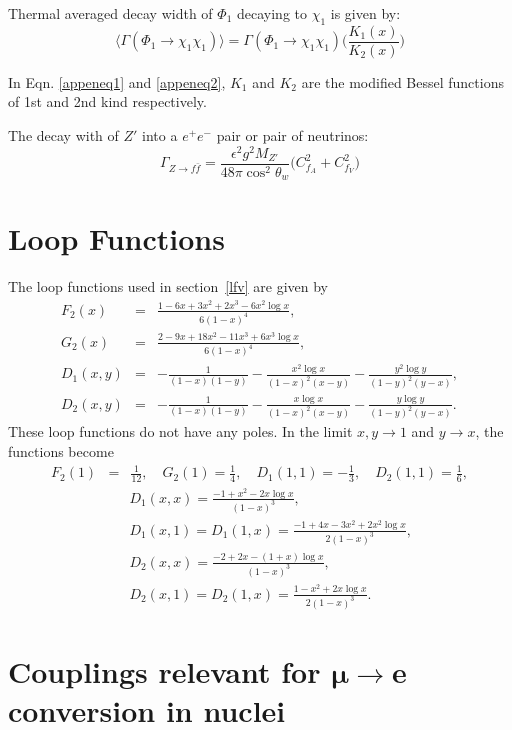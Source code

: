 \documentclass[prd,nofootinbib,preprint,superscriptaddress]{revtex4}
\begin{document}
Thermal averaged decay width of $\Phi_1$ decaying to $\chi_1$ is given by:
\begin{equation}
\langle \Gamma(\Phi_1 \rightarrow \chi_1 \chi_1) \rangle = \Gamma(\Phi_1 \rightarrow \chi_1 \chi_1)  \Bigg(\frac{K_1(x)}{K_2(x)}\Bigg)
\label{appeneq2}
\end{equation}

In Eqn. \eqref{appeneq1} and \eqref{appeneq2}, $K_1$ and $K_2$ are the modified Bessel functions of 1st and 2nd kind respectively.

The decay with of $Z'$ into a $e^+ e^{-}$ pair or pair of neutrinos:
\begin{equation}
\Gamma_{Z\to f \bar{f}} = \frac{\epsilon^2 g^2 M_{Z'}}{48 \pi \cos^2\theta_{w}}\big(C^2_{f_A} + C^2_{f_V}\big)
\end{equation}


\section{Loop Functions}
\label{loopfunc}
The loop functions used in section~\ref{lfv} are given by \cite{Toma:2013zsa}
\begin{eqnarray}
	F_2(x) &=& \frac{1-6x+3x^2+2x^3-6x^2 \log x}{6(1-x)^4}, \\
	G_2(x) &=& \frac{2-9x+18x^2-11x^3+6x^3 \log x}{6(1-x)^4}, \\
	D_1(x,y) &=& - \frac{1}{(1-x)(1-y)} - \frac{x^2 \log x}{(1-x)^2(x-y)} -
	\frac{y^2 \log y}{(1-y)^2(y-x)}, \\
	D_2(x,y) &=& - \frac{1}{(1-x)(1-y)} - \frac{x \log x}{(1-x)^2(x-y)} -
	\frac{y \log y}{(1-y)^2(y-x)}.
\end{eqnarray}
These loop functions do not have any poles. In the limit $x,y\to1$ and
$y\to x$, the functions become 
\begin{eqnarray}
	F_2(1)&=&\frac{1}{12},\quad
	G_2(1)=\frac{1}{4},\quad
	D_1(1,1)=-\frac{1}{3},\quad
	D_2(1,1)=\frac{1}{6},
\end{eqnarray}
\begin{eqnarray}
	&&D_1(x,x)=\frac{-1+x^2-2x\log{x}}{(1-x)^3},\\
	&&D_1(x,1)=D_1(1,x)=\frac{-1+4x-3x^2+2x^2 \log{x}}{2(1-x)^3},\\
	&&D_2(x,x)=\frac{-2+2x-(1+x)\log{x}}{(1-x)^3},\\
	&&D_2(x,1)=D_2(1,x)=\frac{1-x^2+2x\log{x}}{2(1-x)^3}.
\end{eqnarray}

\section{Couplings relevant for $\pmb{\mu \to e}$ conversion in nuclei}
\label{appen3}
\end{document}
